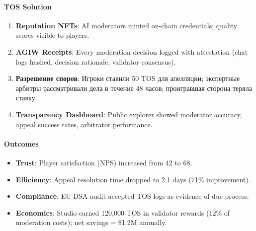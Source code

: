\documentclass[11pt]{article}
\begin{document}
\paragraph{TOS Solution}
\begin{enumerate}[noitemsep]
  \item \textbf{Reputation NFTs}: AI moderators minted on-chain credentials; quality scores visible to players.
  \item \textbf{AGIW Receipts}: Every moderation decision logged with attestation (chat logs hashed, decision rationale, validator consensus).
  \item \textbf{Разрешение споров}: Игроки ставили 50 TOS для апелляции; экспертные арбитры рассматривали дела в течение 48 часов; проигравшая сторона теряла ставку.
  \item \textbf{Transparency Dashboard}: Public explorer showed moderator accuracy, appeal success rates, arbitrator performance.
\end{enumerate}

\paragraph{Outcomes}
\begin{itemize}[noitemsep]
  \item \textbf{Trust}: Player satisfaction (NPS) increased from 42 to 68.
  \item \textbf{Efficiency}: Appeal resolution time dropped to 2.1 days (71\% improvement).
  \item \textbf{Compliance}: EU DSA audit accepted TOS logs as evidence of due process.
  \item \textbf{Economics}: Studio earned 120,000 TOS in validator rewards (12\% of moderation costs); net savings = \$1.2M annually.
\end{itemize}
\end{document}
